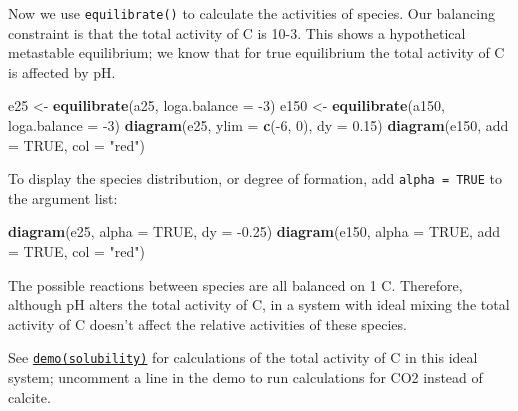 \documentclass[]{tufte-handout}
\newenvironment{Shaded}{}{}
\newcommand{\KeywordTok}[1]{\textcolor[rgb]{0.00,0.44,0.13}{\textbf{#1}}}
\newcommand{\DataTypeTok}[1]{\textcolor[rgb]{0.56,0.13,0.00}{#1}}
\newcommand{\DecValTok}[1]{\textcolor[rgb]{0.25,0.63,0.44}{#1}}
\newcommand{\FloatTok}[1]{\textcolor[rgb]{0.25,0.63,0.44}{#1}}
\newcommand{\StringTok}[1]{\textcolor[rgb]{0.25,0.44,0.63}{#1}}
\newcommand{\OtherTok}[1]{\textcolor[rgb]{0.00,0.44,0.13}{#1}}
\newcommand{\OperatorTok}[1]{\textcolor[rgb]{0.40,0.40,0.40}{#1}}
\newcommand{\NormalTok}[1]{#1}
\begin{document}
Now we use {\texttt{equilibrate()}} to calculate the activities of
species. Our balancing constraint is that the total activity of C is
10-3. This shows a hypothetical metastable equilibrium; we know that for
true equilibrium the total activity of C is affected by pH.

\begin{Shaded}
\begin{Highlighting}[]
\NormalTok{e25 <-}\StringTok{ }\KeywordTok{equilibrate}\NormalTok{(a25, }\DataTypeTok{loga.balance =} \OperatorTok{-}\DecValTok{3}\NormalTok{)}
\NormalTok{e150 <-}\StringTok{ }\KeywordTok{equilibrate}\NormalTok{(a150, }\DataTypeTok{loga.balance =} \OperatorTok{-}\DecValTok{3}\NormalTok{)}
\KeywordTok{diagram}\NormalTok{(e25, }\DataTypeTok{ylim =} \KeywordTok{c}\NormalTok{(}\OperatorTok{-}\DecValTok{6}\NormalTok{, }\DecValTok{0}\NormalTok{), }\DataTypeTok{dy =} \FloatTok{0.15}\NormalTok{)}
\KeywordTok{diagram}\NormalTok{(e150, }\DataTypeTok{add =} \OtherTok{TRUE}\NormalTok{, }\DataTypeTok{col =} \StringTok{"red"}\NormalTok{)}
\end{Highlighting}
\end{Shaded}

To display the species distribution, or degree of formation, add
\texttt{alpha\ =\ TRUE} to the argument list:

\begin{Shaded}
\begin{Highlighting}[]
\KeywordTok{diagram}\NormalTok{(e25, }\DataTypeTok{alpha =} \OtherTok{TRUE}\NormalTok{, }\DataTypeTok{dy =} \OperatorTok{-}\FloatTok{0.25}\NormalTok{)}
\KeywordTok{diagram}\NormalTok{(e150, }\DataTypeTok{alpha =} \OtherTok{TRUE}\NormalTok{, }\DataTypeTok{add =} \OtherTok{TRUE}\NormalTok{, }\DataTypeTok{col =} \StringTok{"red"}\NormalTok{)}
\end{Highlighting}
\end{Shaded}

The possible reactions between species are all balanced on 1 C.
Therefore, although pH alters the total activity of C, in a system with
ideal mixing the total activity of C doesn't affect the relative
activities of these species.

\begin{marginfigure}
See \href{../demo}{{\texttt{demo(solubility)}}} for calculations of the
total activity of C in this ideal system; uncomment a line in the demo
to run calculations for CO2 instead of calcite.
\end{marginfigure}
\end{document}
